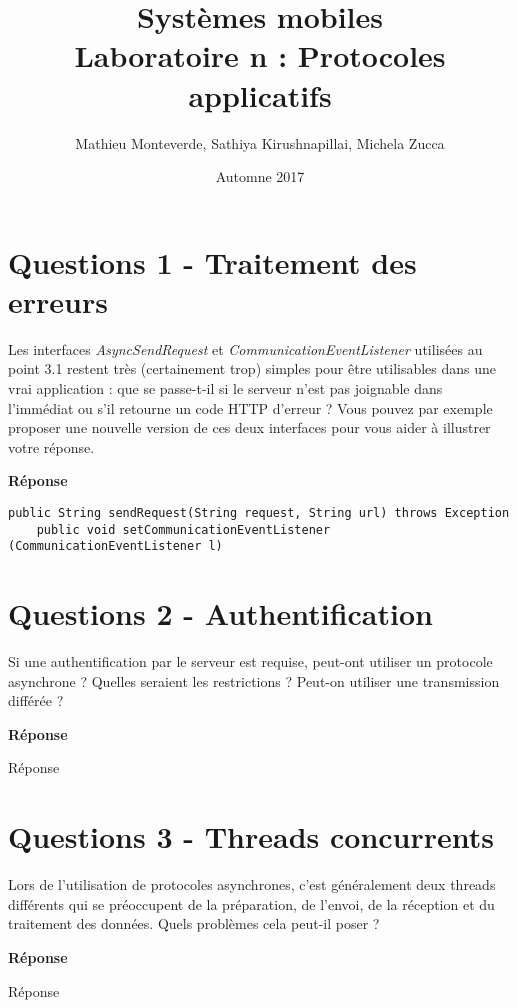 \documentclass[francais,12pt]{article}
\title{Systèmes mobiles \\ Laboratoire n\textordmasculine2 : Protocoles applicatifs}
\author{Mathieu Monteverde, Sathiya Kirushnapillai, Michela Zucca}
\date{Automne 2017}
\begin{document}
	
	\maketitle
	
	\setlength{\parskip}{1em}
	
	\section*{Questions 1 - Traitement des erreurs}
	
	Les interfaces \textit{AsyncSendRequest} et \textit{CommunicationEventListener} utilisées au point 3.1 restent très (certainement trop) simples pour être utilisables dans une vrai application : que se passe-t-il si le serveur n'est pas joignable dans l'immédiat ou s'il retourne un code HTTP d'erreur ? Vous pouvez par exemple proposer une nouvelle version de ces deux interfaces pour vous aider à illustrer votre réponse.
	
	{\color[rgb]{0,0.5,0.23}\textbf{Réponse}}
	
	\begin{lstlisting}[style=javaCode]
	public String sendRequest(String request, String url) throws Exception 
	public void setCommunicationEventListener (CommunicationEventListener l) 
	\end{lstlisting}
	
	\section*{Questions 2 - Authentification}
	Si une authentification par le serveur est requise, peut-ont utiliser un protocole asynchrone ? Quelles seraient les restrictions ? Peut-on utiliser une transmission différée ?
	
	
	{\color[rgb]{0,0.5,0.23}\textbf{Réponse}}
	
	Réponse
	
	
	\section*{Questions 3 - Threads concurrents}
	Lors de l'utilisation de protocoles asynchrones, c'est généralement deux threads différents qui se préoccupent de la préparation, de l'envoi, de la réception et du traitement des données. Quels problèmes cela peut-il poser ?
	
	{\color[rgb]{0,0.5,0.23}\textbf{Réponse}}
	
	Réponse
	
\end{document}
